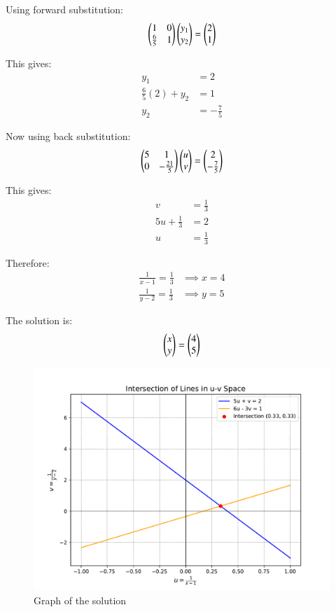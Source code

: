 \documentclass[journal]{IEEEtran}
\begin{document}
Using forward substitution:
\begin{align}
    \begin{pmatrix}1 & 0\\\frac{6}{5} & 1\end{pmatrix}\begin{pmatrix}y_1\\y_2\end{pmatrix} = \begin{pmatrix}2\\1\end{pmatrix}
\end{align}

This gives:
\begin{align}
    y_1 &= 2\\
    \frac{6}{5}(2) + y_2 &= 1\\
    y_2 &= -\frac{7}{5}
\end{align}

Now using back substitution:
\begin{align}
    \begin{pmatrix}5 & 1\\0 & -\frac{21}{5}\end{pmatrix}\begin{pmatrix}u\\v\end{pmatrix} = \begin{pmatrix}2\\-\frac{7}{5}\end{pmatrix}
\end{align}

This gives:
\begin{align}
    v &= \frac{1}{3}\\
    5u + \frac{1}{3} &= 2\\
    u &= \frac{1}{3}
\end{align}

Therefore:
\begin{align}
    \frac{1}{x-1} = \frac{1}{3} &\implies x = 4\\
    \frac{1}{y-2} = \frac{1}{3} &\implies y = 5
\end{align}

The solution is:
\begin{align}
    \begin{pmatrix}x\\y\end{pmatrix} = \begin{pmatrix}4\\5\end{pmatrix}
\end{align}

\begin{figure}[h!]
   \centering
	 \includegraphics[width=\textwidth]{figs/fig.pdf}
   \caption{Graph of the solution}
\end{figure}
\end{document}
